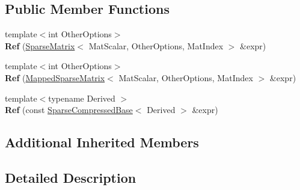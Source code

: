 \subsection*{Public Member Functions}
\begin{DoxyCompactItemize}
\item 
\mbox{\label{class_eigen_1_1_ref_3_01_sparse_matrix_3_01_mat_scalar_00_01_mat_options_00_01_mat_index_01_4_0024ec28acf7b4e76d8ff99a0bdc39c296_a6e5f2a6f091c8a9b1f35c4838e4e721b}} 
{\footnotesize template$<$int Other\+Options$>$ }\\{\bfseries Ref} (\mbox{\hyperlink{class_eigen_1_1_sparse_matrix}{Sparse\+Matrix}}$<$ Mat\+Scalar, Other\+Options, Mat\+Index $>$ \&expr)
\item 
\mbox{\label{class_eigen_1_1_ref_3_01_sparse_matrix_3_01_mat_scalar_00_01_mat_options_00_01_mat_index_01_4_0024ec28acf7b4e76d8ff99a0bdc39c296_aeba93dd935255d739295ae8642e3c3e9}} 
{\footnotesize template$<$int Other\+Options$>$ }\\{\bfseries Ref} (\mbox{\hyperlink{class_eigen_1_1_mapped_sparse_matrix}{Mapped\+Sparse\+Matrix}}$<$ Mat\+Scalar, Other\+Options, Mat\+Index $>$ \&expr)
\item 
\mbox{\label{class_eigen_1_1_ref_3_01_sparse_matrix_3_01_mat_scalar_00_01_mat_options_00_01_mat_index_01_4_0024ec28acf7b4e76d8ff99a0bdc39c296_a0e87d2d88da89611227a55c0a689905a}} 
{\footnotesize template$<$typename Derived $>$ }\\{\bfseries Ref} (const \mbox{\hyperlink{class_eigen_1_1_sparse_compressed_base}{Sparse\+Compressed\+Base}}$<$ Derived $>$ \&expr)
\end{DoxyCompactItemize}
\subsection*{Additional Inherited Members}


\subsection{Detailed Description}
